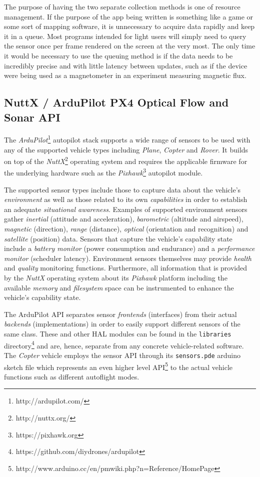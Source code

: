 \documentclass[paper=letter, fontsize=11pt]{scrartcl}
\numberwithin{equation}{section}
\numberwithin{figure}{section}
\numberwithin{table}{section}
\begin{document}
\par
The purpose of having the two separate collection methods is one of resource
management. If the purpose of the app being written is something like a game or
some sort of mapping software, it is unnecessary to acquire data rapidly and
keep it in a queue. Most programs intended for light users will simply need to
query the sensor once per frame rendered on the screen at the very most. The
only time it would be necessary to use the queuing method is if the data needs
to be incredibly precise and with little latency between updates, such as if
the device were being used as a magnetometer in an experiment measuring
magnetic flux.

\subsection{NuttX / ArduPilot PX4 Optical Flow and Sonar API}
\label{sec:ardupilot_flow_api}
\lstset{language=C++}
\par
The {\em ArduPilot}\footnote{http://ardupilot.com/} autopilot stack supports a
wide range of sensors to be used with any of the supported vehicle types
including {\em Plane}, {\em Copter} and {\em Rover}. It builds on top of the
{\em NuttX}\footnote{http://nuttx.org/} operating system and requires the
applicable firmware for the underlying hardware such as the
{\em Pixhawk}\footnote{https://pixhawk.org} autopilot module.

\par
The supported sensor types include those to capture data about the vehicle's
{\em environment} as well as those related to its own {\em capabilities} in
order to establish an adequate {\em situational awareness}.
Examples of supported environment sensors gather {\em inertial} (attitude and
acceleration), {\em barometric} (altitude and airspeed), {\em magnetic}
(direction), {\em range} (distance), {\em optical} (orientation and recognition)
and {\em satellite} (position) data. Sensors that capture the vehicle's
capability state include a {\em battery monitor} (power consumption and
endurance) and a {\em performance monitor} (scheduler latency). Environment
sensors themselves may provide {\em health} and {\em quality} monitoring
functions. Furthermore, all information that is provided by the {\em NuttX}
operating system about its {\em Pixhawk} platform including the available
{\em memory} and {\em filesystem} space can be instrumented to enhance the
vehicle's capability state.

\par
The {ArduPilot} \ac{API} separates sensor {\em frontends} (interfaces) from
their actual {\em backends} (implementations) in order to easily support
different sensors of the same class. These and other \ac{HAL} modules can be
found in the \texttt{libraries}
directory\footnote{https://github.com/diydrones/ardupilot} and are, hence,
separate from any concrete vehicle-related software. The {\em Copter} vehicle
employs the sensor \ac{API} through its \texttt{sensors.pde} arduino sketch
file which represents an even higher level
\ac{API}\footnote{http://www.arduino.cc/en/pmwiki.php?n=Reference/HomePage}
to the actual vehicle functions such as different autoflight modes.
\end{document}
